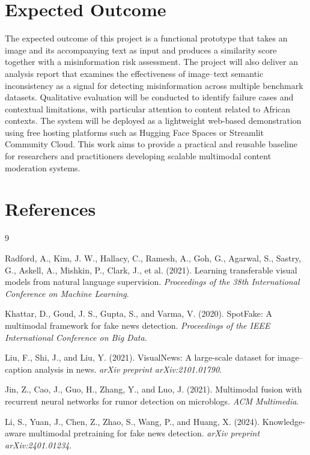 \documentclass[a4paper,10.5pt,twoside]{article}
\begin{document}
\section{Expected Outcome}

The expected outcome of this project is a functional prototype that takes an image and its accompanying text as input and produces a similarity score together with a misinformation risk assessment. The project will also deliver an analysis report that examines the effectiveness of image--text semantic inconsistency as a signal for detecting misinformation across multiple benchmark datasets. Qualitative evaluation will be conducted to identify failure cases and contextual limitations, with particular attention to content related to African contexts. The system will be deployed as a lightweight web-based demonstration using free hosting platforms such as Hugging Face Spaces or Streamlit Community Cloud. This work aims to provide a practical and reusable baseline for researchers and practitioners developing scalable multimodal content moderation systems.


\section{References}

\begin{thebibliography}{9}

Radford, A., Kim, J. W., Hallacy, C., Ramesh, A., Goh, G., Agarwal, S., Sastry, G., Askell, A., Mishkin, P., Clark, J., et al. (2021).
Learning transferable visual models from natural language supervision.
\textit{Proceedings of the 38th International Conference on Machine Learning}.

Khattar, D., Goud, J. S., Gupta, S., and Varma, V. (2020).
SpotFake: A multimodal framework for fake news detection.
\textit{Proceedings of the IEEE International Conference on Big Data}.

Liu, F., Shi, J., and Liu, Y. (2021).
VisualNews: A large-scale dataset for image--caption analysis in news.
\textit{arXiv preprint arXiv:2101.01790}.

Jin, Z., Cao, J., Guo, H., Zhang, Y., and Luo, J. (2021).
Multimodal fusion with recurrent neural networks for rumor detection on microblogs.
\textit{ACM Multimedia}.

Li, S., Yuan, J., Chen, Z., Zhao, S., Wang, P., and Huang, X. (2024).
Knowledge-aware multimodal pretraining for fake news detection.
\textit{arXiv preprint arXiv:2401.01234}.


\end{thebibliography}
\end{document}
